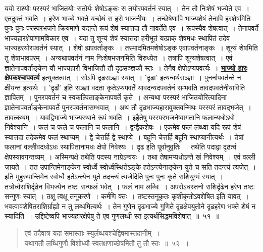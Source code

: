 \documentclass[11pt, openany]{book}
\begin{document}
{{ ययो राश्योः परस्परं भाजितयोः सतोर्यः शेषोऽङ्कः स तयोरपवर्तनं स्यात्~। 
तेन तौ निःशेषं भज्येते एव~। एतदुक्तं भवति~। हरेण भाज्ये भक्ते यच्छेषं स
हरो  भाजनीयः~। तच्छेषेणापि भाज्यशेषं तेनापि हरशेषमिति पुनः पुनः परस्परभजने 
क्रियमाणे यद्यन्ते रूपं शेषं स्यात्तदा तौ नावर्तेते एव~। रूपस्यैव
शेषत्वात्~। तेनापवर्ते भाज्यहारक्षेपाणामविकार एव~। यदा तु शून्यं शेषं
स्यात्तदा हरीभूतं यत्प्राक् शेषमधः स्थापितं तदेव भाज्यहरयोरपवर्तनं स्यात्~। शेषो ह्यपवर्ताङ्कः~। तस्मादमितमशेषोऽङ्क एवापवर्तनाङ्कः~। शून्यं शेषमिति तु शेषाभावपरम्~।
अन्यथापवर्तनं नाम निःशेषभजनमिति विरुध्येत~। तत्रापि शून्यशेषत्वात्~। एवं
ज्ञातेनापवर्ताङ्केन यौ भाज्यहारौ विभाजितौ तौ दृढसञ्ज्ञकौ स्तः~। तेनैव क्षेपोऽप्यपवर्त्यः~। \hyperref[50]{\textbf{भाज्यो हारः क्षेपकश्चापवर्त्य}} इत्युक्तत्वात्~। सोऽपि दृढसञ्ज्ञः स्यात्~। 'दृढा' इत्यन्वर्थसञ्ज्ञा~। पुनर्नापवर्तन्ते न क्षीयन्त इत्यर्थः~। 'दृढौ' इति सञ्ज्ञां वदता कृतेऽप्यपवर्ते यावदन्यदपवर्तनं सम्भवति तावदपवर्तनीयाविति ज्ञापितम्~।
पुनरपवर्तनं च स्वकल्पिताङ्केनापवर्ते  कृते~। अन्यथा परस्परं भाजितयोरित्यादिना ज्ञातेनापवर्ताङ्केनापवर्ते
पुनरपवर्तनासम्भवात्~। अथ तौ दृढभाज्यहारावुक्तवन्मिथः परस्परं तावद्भजेत्~।
तावत्कथम्~। यावद्विभाज्ये भाज्यस्थाने रूपं भवति~। इहैतेषु परस्परभजनेष्वागतानि
फलान्यधोऽधो  निवेश्यानि~। फलं च फले च फलानि च फलानि~। द्वन्द्वैकशेषः~। एकमेव फलं लब्ध्वा यदि रूपं शेषं स्यात्तदा तदेकमेव फलं स्थाप्यम्~। द्वे चेत्तर्हि
द्वे स्थाप्ये~।  बहूनि चेत्तर्हि बहूनि स्थाप्यानीत्यर्थः~। तेषां फलानां वल्लीवदधोऽधः
स्थापितानामधः  क्षेपो निवेश्यः~। दृढ इति पूर्वानुवृतिः~। तथेति पदाद्वा दृढत्वं
क्षेपस्यावगन्तव्यम्~। अस्मिन्पक्षे तथेति पदस्य नाग्रेऽन्वयः~। तथा तेषामप्यधोऽन्ते खं
निवेश्यम्~। एवं वल्ली जायते~। तत उपान्तिमेनाङ्केन स्वोर्ध्वे स्वोर्ध्वस्थितेऽङ्के
हतेऽन्त्येनाङ्केन युते च सति तदन्त्यं त्यजेत्~। इति मुहुरुपान्तिमेन स्वोर्ध्वे हतेऽन्त्येन
युते तदन्त्यं
\newpage
\noindent त्यजेदिति पुनः पुनः कृते राशियुग्मं स्यात्~।
तत्रोर्ध्वराशिर्दृढेन विभज्येन तष्टः
सन्फलं भवेत्~। फलं नाम लब्धिः~। अपरोऽधस्तनो राशिर्दृढेन हरेण तष्टः
सन्गुणः स्यात्~। तक्षू त्वक्षू तनूकरणे~। कर्मणि क्तः~।
तष्टस्तनूकृतः 
कृशीकृतोऽवशेषित इति यावत्~। भवत्वावशेषितराशिर्ग्राह्यो न तु
लब्धमित्यर्थः~। 
तेन गुणेन दृढभाज्ये गुणिते दृढक्षेपयुतोने दृढहरेण भक्ते शेषं न स्यादिति~।
उद्दिष्टेष्वपि भाज्यहारक्षेपेषु ते एव गुणलब्धी स्त इत्यर्थसिद्धमविशेषात्~॥~५१~॥

 \label{52}
\begin{quote}
    \ab 
    एवं तदैवात्र यदा समास्ताः स्युर्लब्धयश्चेद्विषमास्तदानीम्~। \\
यथागतौ लब्धिगुणौ विशोध्यौ स्वतक्षणाच्छेषमितौ तु तौ स्तः~॥~५२~॥
\end{quote}

}}
\end{document}
